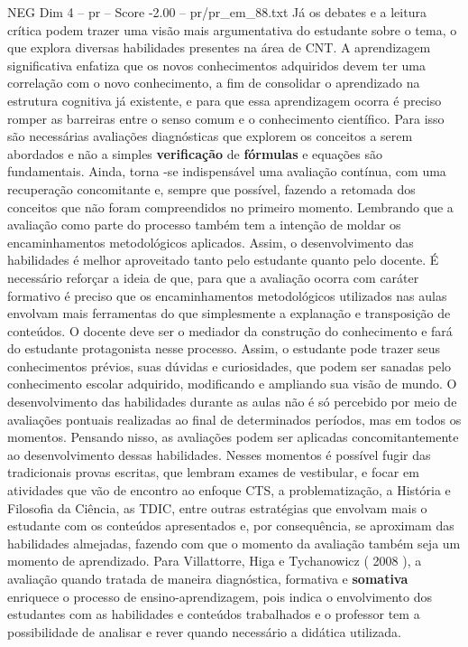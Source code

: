 \begin{textsample}{NEG Dim 4 – pr – Score -2.00 – pr/pr\_em\_88.txt}
Já os debates e a leitura crítica podem trazer uma visão mais argumentativa do estudante sobre o tema, o que explora diversas habilidades presentes na área de CNT.
A aprendizagem significativa enfatiza que os novos conhecimentos adquiridos devem ter uma correlação com o novo conhecimento, a fim de consolidar o aprendizado na estrutura cognitiva já existente, e para que essa aprendizagem ocorra é preciso romper as barreiras entre o senso comum e o conhecimento científico.
Para isso são necessárias avaliações diagnósticas que explorem os conceitos a serem abordados e não a simples \textbf{verificação} de \textbf{fórmulas} e equações são fundamentais.
Ainda, torna -se indispensável uma avaliação contínua, com uma recuperação concomitante e, sempre que possível, fazendo a retomada dos conceitos que não foram compreendidos no primeiro momento.
Lembrando que a avaliação como parte do processo também tem a intenção de moldar os encaminhamentos metodológicos aplicados.
Assim, o desenvolvimento das habilidades é melhor aproveitado tanto pelo estudante quanto pelo docente.
É necessário reforçar a ideia de que, para que a avaliação ocorra com caráter formativo é preciso que os encaminhamentos metodológicos utilizados nas aulas envolvam mais ferramentas do que simplesmente a explanação e transposição de conteúdos.
O docente deve ser o mediador da construção do conhecimento e fará do estudante protagonista nesse processo.
Assim, o estudante pode trazer seus conhecimentos prévios, suas dúvidas e curiosidades, que podem ser sanadas pelo conhecimento escolar adquirido, modificando e ampliando sua visão de mundo.
O desenvolvimento das habilidades durante as aulas não é só percebido por meio de avaliações pontuais realizadas ao final de determinados períodos, mas em todos os momentos.
Pensando nisso, as avaliações podem ser aplicadas concomitantemente ao desenvolvimento dessas habilidades.
Nesses momentos é possível fugir das tradicionais provas escritas, que lembram exames de vestibular, e focar em atividades que vão de encontro ao enfoque CTS, a problematização, a História e Filosofia da Ciência, as TDIC, entre outras estratégias que envolvam mais o estudante com os conteúdos apresentados e, por consequência, se aproximam das habilidades almejadas, fazendo com que o momento da avaliação também seja um momento de aprendizado.
Para Villattorre, Higa e Tychanowicz ( 2008 ), a avaliação quando tratada de maneira diagnóstica, formativa e \textbf{somativa} enriquece o processo de ensino-aprendizagem, pois indica o envolvimento dos estudantes com as habilidades e conteúdos trabalhados e o professor tem a possibilidade de analisar e rever quando necessário a didática utilizada.

\end{textsample}
